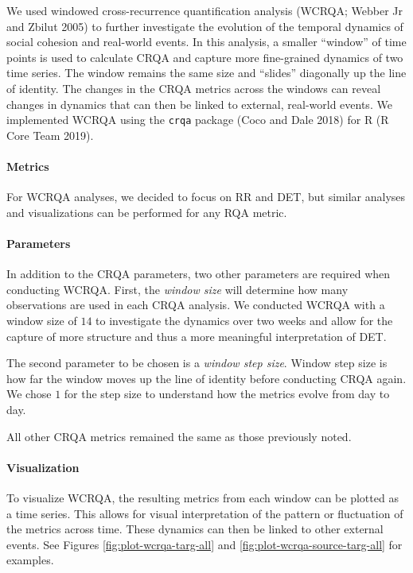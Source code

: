 \documentclass[
  english,
  man]{apa6}
\let\oldparagraph\paragraph
\renewcommand{\paragraph}[1]{\oldparagraph{#1}\mbox{}}
\begin{document}
We used windowed cross-recurrence quantification analysis (WCRQA; Webber Jr and Zbilut 2005) to further investigate the evolution of the temporal
dynamics of social cohesion and real-world events. In this analysis, a smaller
\enquote{window} of time points is used to calculate CRQA and capture more fine-grained
dynamics of two time series. The window remains the same size and \enquote{slides}
diagonally up the line of identity. The changes in the CRQA metrics across the
windows can reveal changes in dynamics that can then be linked to external,
real-world events. We implemented WCRQA using the \texttt{crqa} package (Coco and Dale 2018) for R
(R Core Team 2019).

\hypertarget{metrics-1}{%
\paragraph{Metrics}\label{metrics-1}}

For WCRQA analyses, we decided to focus on RR and DET, but similar analyses and
visualizations can be performed for any RQA metric.

\hypertarget{parameters-1}{%
\paragraph{Parameters}\label{parameters-1}}

In addition to the CRQA parameters, two other parameters are required when
conducting WCRQA. First, the \emph{window size} will determine how many observations
are used in each CRQA analysis. We conducted WCRQA with a window size of \(14\) to
investigate the dynamics over two weeks and allow for the capture of more
structure and thus a more meaningful interpretation of DET.

The second parameter to be chosen is a \emph{window step size}. Window step size is
how far the window moves up the line of identity before conducting CRQA again.
We chose \(1\) for the step size to understand how the metrics evolve from day to
day.

All other CRQA metrics remained the same as those previously noted.

\hypertarget{visualization-1}{%
\paragraph{Visualization}\label{visualization-1}}

To visualize WCRQA, the resulting metrics from each window can be plotted as a
time series. This allows for visual interpretation of the pattern or fluctuation
of the metrics across time. These dynamics can then be linked to other external
events. See Figures \ref{fig:plot-wcrqa-targ-all} and
\ref{fig:plot-wcrqa-source-targ-all} for examples.
\end{document}
